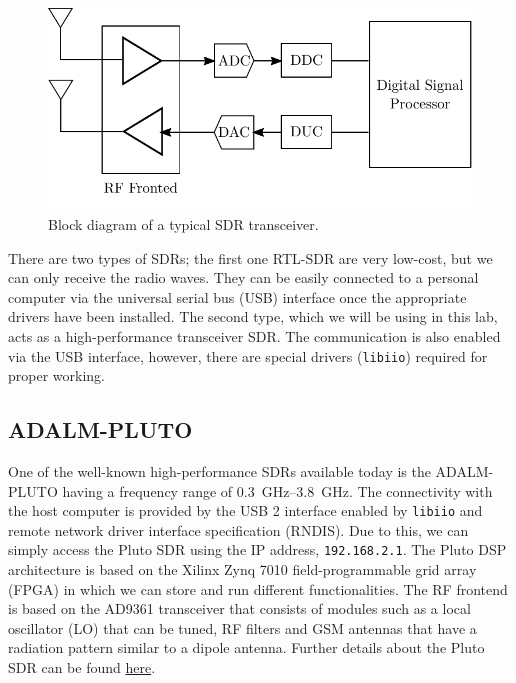 \documentclass[11pt]{article}
\begin{document}
\begin{figure}
  \centering
  \includegraphics[width=\linewidth]{block_diagram.pdf}
  \caption{Block diagram of a typical SDR transceiver.}
  \label{fig:SDR_block}
\end{figure}

There are two types of SDRs; the first one RTL-SDR are very low-cost, but we can only receive the radio waves. They can be easily connected to a personal computer via the universal serial bus (USB) interface once the appropriate drivers have been installed. The second type, which we will be using in this lab, acts as a high-performance transceiver SDR. The communication is also enabled via the USB interface, however, there are special drivers (\texttt{libiio}) required for proper working. 



\subsection{ADALM-PLUTO}
One of the well-known high-performance SDRs available today is the ADALM-PLUTO having a frequency range of \SIrange{0.3}{3.8}{\giga \hertz}. The connectivity with the host computer is provided by the USB 2 interface enabled by \texttt{libiio} and remote network driver interface specification (RNDIS). Due to this, we can simply access the Pluto SDR using the IP address, \texttt{192.168.2.1}. The Pluto DSP architecture is based on the Xilinx Zynq 7010 field-programmable grid array (FPGA) in which we can store and run different functionalities. The RF frontend is based on the AD9361 transceiver that consists of modules such as a local oscillator (LO) that can be tuned, RF filters and GSM antennas that have a radiation pattern similar to a dipole antenna. Further details about the Pluto SDR can be found \href{https://wiki.analog.com/university/tools/pluto/users}{here}.
\end{document}
